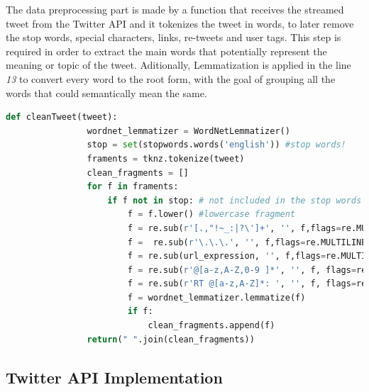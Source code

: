 \documentclass{article}
\begin{document}
        The data preprocessing part is made by a function that receives the streamed tweet from the Twitter API and it tokenizes the tweet in words, to later remove the stop words, special characters, links, re-tweets and user tags. This step is required in order to extract the main words that potentially represent the meaning or topic of the tweet. Aditionally, Lemmatization is applied in the line \textit{13} to convert every word to the root 
        form, with the goal of grouping all the words that could semantically mean the same.
        \begin{lstlisting}[language=Python, caption= Python Cleaning Function, label={lst:dataCleaning}]
            def cleanTweet(tweet):    
                wordnet_lemmatizer = WordNetLemmatizer()
                stop = set(stopwords.words('english')) #stop words!
                framents = tknz.tokenize(tweet)
                clean_fragments = []
                for f in framents:
                    if f not in stop: # not included in the stop words
                        f = f.lower() #lowercase fragment
                        f = re.sub(r'[.,"!~_:|?\']+', '', f,flags=re.MULTILINE) # Special characters
                        f =  re.sub(r'\.\.\.', '', f,flags=re.MULTILINE)) # 3 dots
                        f = re.sub(url_expression, '', f,flags=re.MULTILINE) # links
                        f = re.sub(r'@[a-z,A-Z,0-9 ]*', '', f, flags=re.MULTILINE) #clean at person references
                        f = re.sub(r'RT @[a-z,A-Z]*: ', '', f, flags=re.MULTILINE) #Remove retweets
                        f = wordnet_lemmatizer.lemmatize(f)
                        if f:
                            clean_fragments.append(f)
                return(" ".join(clean_fragments))
        \end{lstlisting}

        \subsection{Twitter API Implementation}
\end{document}
